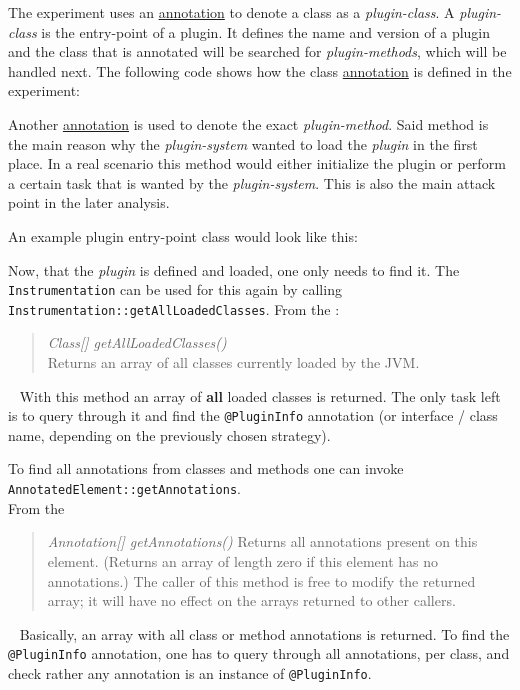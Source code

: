 The experiment uses an \underline{annotation} to denote a class as a \textit{plugin-class}.
A \textit{plugin-class} is the entry-point of a plugin.
It defines the name and version of a plugin and the class that is annotated will be searched for \textit{plugin-methods}, which will be handled next.
The following code shows how the class \underline{annotation} is defined in the experiment:


Another \underline{annotation} is used to denote the exact \textit{plugin-method}.
Said method is the main reason why the \textit{plugin-system} wanted to load the \textit{plugin} in the first place.
In a real scenario this method would either initialize the plugin or perform a certain task that is wanted by the \textit{plugin-system}.
This is also the main attack point in the later analysis.


\clearpage

An example plugin entry-point class would look like this:


Now, that the \textit{plugin} is defined and loaded, one only needs to find it.
The \lstinline{Instrumentation} can be used for this again by calling \lstinline{Instrumentation::getAllLoadedClasses}.
From the \textcite{javadoc:instrumentation}:
\begin{quote}
    \textit{Class[] getAllLoadedClasses()}\\
    Returns an array of all classes currently loaded by the JVM.
\end{quote}~\parencite{javadoc:instrumentation}
With this method an array of \textbf{all} loaded classes is returned.
The only task left is to query through it and find the \lstinline{@PluginInfo} annotation (or interface / class name, depending on the previously chosen strategy).

To find all annotations from classes and methods one can invoke \lstinline{AnnotatedElement::getAnnotations}.\\
From the \textcite{javadoc:annotated_element}
\begin{quote}
    \textit{Annotation[] getAnnotations()}
    Returns all annotations present on this element. (Returns an array of length zero if this element has no annotations.) The caller of this method is free to modify the returned array; it will have no effect on the arrays returned to other callers.
\end{quote}~\parencite{javadoc:annotated_element}
Basically, an array with all class or method annotations is returned.
To find the \lstinline{@PluginInfo} annotation, one has to query through all annotations, per class, and check rather any annotation is an instance of \lstinline{@PluginInfo}.

